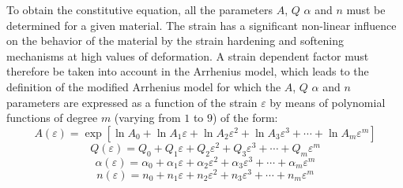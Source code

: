 \documentclass[metals,article,submit,pdftex,moreauthors]{Definitions/mdpi}
\begin{document}
To obtain the constitutive equation, all the parameters $A$, $Q$ $\alpha$ and $n$ must be determined for a given material.
The strain has a significant non-linear influence on the behavior of the material by the strain hardening and softening mechanisms at high values of deformation.
A strain dependent factor must therefore be taken into account in the Arrhenius model, which leads to the definition of the modified Arrhenius model for which the $A$, $Q$ $\alpha$ and $n$ parameters are expressed as a function of the strain $\varepsilon$ by means of polynomial functions of degree $m$ (varying from $1$ to $9$) of the form:
\begin{equation}
A(\varepsilon) = \exp{\left[\ln\!A_0 + \ln\!A_1\varepsilon + \ln\!A_2\varepsilon^2 + \ln\!A_3\varepsilon^3 + \cdots + \ln\!A_m\varepsilon^m\right]}
\label{eq:ArA}
\end{equation}
\begin{equation}
Q(\varepsilon) = Q_0 + Q_1\varepsilon + Q_2\varepsilon^2 + Q_3\varepsilon^3 + \cdots + Q_m\varepsilon^m
\label{eq:ArQ}
\end{equation}
\begin{equation}
\alpha(\varepsilon) = \alpha_0 + \alpha_1\varepsilon + \alpha_2\varepsilon^2 + \alpha_3\varepsilon^3 + \cdots + \alpha_m\varepsilon^m
\label{eq:Aralpha}
\end{equation}
\begin{equation}
n(\varepsilon) = n_0 + n_1\varepsilon + n_2\varepsilon^2 + n_3\varepsilon^3 + \cdots + n_m\varepsilon^m
\label{eq:Arn}
\end{equation}
\end{document}
